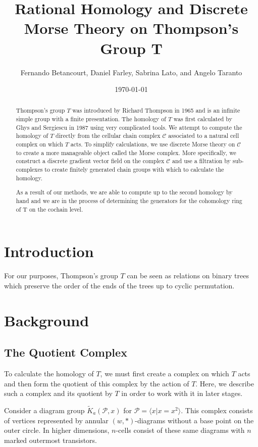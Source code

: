 \documentclass{amsart}
\title[ Rational Homology and Discrete Morse Theory on Thompson's Group T]{Rational Homology and Discrete Morse Theory on Thompson's Group T}
\author{Fernando Betancourt, Daniel Farley, Sabrina Lato, and Angelo Taranto}
\date{\today}
\begin{document}
\maketitle



\begin{abstract} 
Thompson's group $T$ was introduced by Richard Thompson in 1965 and is an infinite simple group with a finite presentation. The homology of $T$ was first calculated by Ghys and Sergiescu in 1987 using very complicated tools. We attempt to compute the homology of $T$ directly from the cellular chain complex $\mathcal{C}$ associated to a natural cell complex on which $T$ acts. To simplify calculations, we use discrete Morse theory on $\mathcal{C}$ to create a more manageable object called the Morse complex. More specifically, we construct a discrete gradient vector field on the complex $\mathcal{C}$ and use a filtration by sub-complexes to create finitely generated chain groups with which to calculate the homology.

As a result of our methods, we are able to compute up to the second homology by hand and we are in the process of determining the generators for the cohomology ring of T on the cochain level. 

\end{abstract}

\section{Introduction}
For our purposes, Thompson's group $T$ can be seen as relations on binary trees which preserve the order of the ends of the trees up to cyclic permutation.


\section{Background}

\subsection{The Quotient Complex }
To calculate the homology of $T$, we must first create a complex on which $T$ acts and then form the quotient of this complex by the action of $T$. Here, we describe such a complex and its quotient by $T$ in order to work with it in later stages.

Consider a diagram group $\widetilde{K}_{a}(\mathcal{P}, x)$ for $\mathcal{P} = \langle x | x = x^{2} \rangle$. This complex consists of vertices represented by annular $(w, *)$-diagrams without a base point on the outer circle. In higher dimensions, $n$-cells consist of these same diagrams with $n$ marked outermost transistors. 
\end{document}
